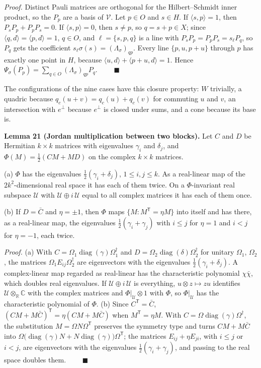 \documentclass[11pt,a4paper]{article}
\newcommand{\lt}{<}
\begin{document}
\emph{Proof.} Distinct Pauli matrices are orthogonal for the Hilbert--Schmidt inner product, so the \(P_p\) are
a basis of \(\mathcal V\). Let \(p\in O\) and \(s\in H\). If \(\langle s,p\rangle=1\), then \(P_sP_p+P_pP_s=0\). If
\(\langle s,p\rangle=0\), then \(s\neq p\), so \(q=s+p\in X\); since \(\langle q,d\rangle=\langle p,d\rangle=1\), \(q\in O\), and
\(\ell=\{s,p,q\}\) is a line with \(P_sP_p=P_pP_s=s_\ell P_q\), so \(P_q\) gets the coefficient
\(s_\ell\sigma(s)=(\Lambda_\sigma)_{qp}\). Every line \(\{p,u,p+u\}\) through \(p\) has exactly one point in \(H\), because \(\langle u,d\rangle+\langle p+u,d\rangle=1\). Hence
\(\Psi_\sigma(P_p)=\sum_{q\in O}(\Lambda_\sigma)_{qp}P_q\). \(\qquad\blacksquare\)

The configurations of the nine cases have this closure property: \(W\) trivially, a quadric because
\(q_c(u+v)=q_c(u)+q_c(v)\) for commuting \(u\) and \(v\), an intersection with \(e^\perp\) because \(e^\perp\) is
closed under sums, and a cone because its base is.

\textbf{Lemma 21 (Jordan multiplication between two blocks).} Let \(C\) and \(D\) be Hermitian \(k\times k\)
matrices with eigenvalues \(\gamma_i\) and \(\delta_j\), and \(\Phi(M)=\frac12(CM+MD)\) on the complex
\(k\times k\) matrices.

(a) \(\Phi\) has the eigenvalues \(\frac12(\gamma_i+\delta_j)\), \(1\le i,j\le k\). As a real-linear map of the
\(2k^2\)-dimensional real space it has each of them twice. On a \(\Phi\)-invariant real subspace
\(\mathcal U\) with \(\mathcal U\oplus i\,\mathcal U\) equal to all complex matrices it has each of them once.

(b) If \(D=\bar C\) and \(\eta=\pm1\), then \(\Phi\) maps \(\{M:M^{\mathsf T}=\eta M\}\) into itself and has
there, as a real-linear map, the eigenvalues \(\frac12(\gamma_i+\gamma_j)\) with \(i\le j\) for \(\eta=1\)
and \(i\lt j\) for \(\eta=-1\), each twice.

\emph{Proof.} (a) With \(C=\Omega_1\operatorname{diag}(\gamma)\Omega_1^\dagger\) and
\(D=\Omega_2\operatorname{diag}(\delta)\Omega_2^\dagger\) for unitary \(\Omega_1\), \(\Omega_2\), the matrices
\(\Omega_1E_{ij}\Omega_2^\dagger\) are eigenvectors with the eigenvalues \(\frac12(\gamma_i+\delta_j)\). A
complex-linear map regarded as real-linear has the characteristic polynomial \(\chi\bar\chi\), which doubles
real eigenvalues. If \(\mathcal U\oplus i\,\mathcal U\) is everything, \(u\otimes z\mapsto zu\) identifies
\(\mathcal U\otimes_{\mathbb R}\mathbb C\) with the complex matrices and \(\Phi|_{\mathcal U}\otimes1\) with \(\Phi\), so
\(\Phi|_{\mathcal U}\) has the characteristic polynomial of \(\Phi\). (b) Since \(C^{\mathsf T}=\bar C\),
\((CM+M\bar C)^{\mathsf T}=\eta(CM+M\bar C)\) when \(M^{\mathsf T}=\eta M\). With
\(C=\Omega\operatorname{diag}(\gamma)\Omega^\dagger\), the substitution \(M=\Omega N\Omega^{\mathsf T}\) preserves the
symmetry type and turns \(CM+M\bar C\) into \(\Omega\bigl(\operatorname{diag}(\gamma)N+N\operatorname{diag}(\gamma)\bigr)\Omega^{\mathsf T}\);
the matrices \(E_{ij}+\eta E_{ji}\), with \(i\le j\) or \(i\lt j\), are eigenvectors with the eigenvalues
\(\frac12(\gamma_i+\gamma_j)\), and passing to the real space doubles them. \(\qquad\blacksquare\)
\end{document}
